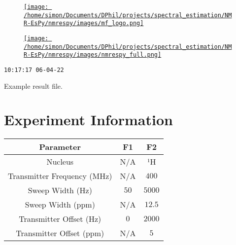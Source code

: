 \documentclass[8pt]{article}
\begin{document}
\begin{figure}[!ht]
\begin{minipage}[b][2.5cm][c]{.72\textwidth}
\href{http://foroozandeh.chem.ox.ac.uk/home}%
{\texttt{[image: /home/simon/Documents/DPhil/projects/spectral\_estimation/NMR-EsPy/nmrespy/images/mf\_logo.png]}}
\end{minipage}
\begin{minipage}[b][2.5cm][c]{.27\textwidth}
\href{https://foroozandehgroup.github.io/NMR-EsPy}%
{\texttt{[image: /home/simon/Documents/DPhil/projects/spectral\_estimation/NMR-EsPy/nmrespy/images/nmrespy\_full.png]}}
\end{minipage}
\end{figure}
\texttt{10:17:17 06-04-22}

Example result file.

\section*{Experiment Information}
\begin{longtable}[l]{c c c}
\toprule
Parameter & F1 & F2\\
\midrule
Nucleus & N/A & ¹H\\
Transmitter Frequency (MHz) & N/A & $\num{400}$\\
Sweep Width (Hz) & $\num{50}$ & $\num{5000}$\\
Sweep Width (ppm) & N/A & $\num{12.5}$\\
Transmitter Offset (Hz) & $\num{0}$ & $\num{2000}$\\
Transmitter Offset (ppm) & N/A & $\num{5}$\\
\bottomrule
\end{longtable}
\end{document}
